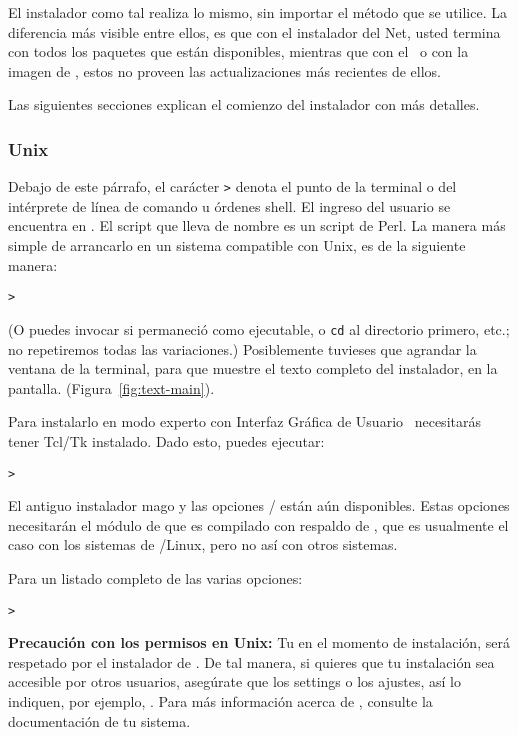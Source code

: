 \documentclass{article}
\begin{document}
El instalador como tal realiza lo mismo, sin importar el método que
se utilice. La diferencia más visible entre ellos, es que con el
instalador del Net, usted termina con todos los paquetes que están
disponibles, mientras que con el \DVD\ o con la imagen de
\ISO, estos no proveen las actualizaciones más recientes de
ellos.

\noindent
Las siguientes secciones explican el comienzo del instalador con más
detalles.

\subsubsection{Unix}

Debajo de este párrafo, el carácter \texttt{>} denota el
punto de la terminal o del intérprete de línea de comando u órdenes shell.
El ingreso del usuario se encuentra en
.  El script que lleva de nombre
 es un script de Perl. La manera más
simple de arrancarlo en un sistema compatible con Unix, es
de la siguiente manera: 

\begin{alltt} 
	>  
\end{alltt} 

(O puedes invocar  si
permaneció como ejecutable, o \texttt{cd} al directorio
primero, etc.; no repetiremos todas las variaciones.)
Posiblemente tuvieses que agrandar la ventana de la
terminal, para que muestre el texto completo del instalador,
en la pantalla.  (Figura~\ref{fig:text-main}).

Para instalarlo en modo experto con Interfaz Gráfica de
Usuario \GUI\, necesitarás tener Tcl/Tk instalado. Dado
esto, puedes ejecutar:
\begin{alltt}
	> 
\end{alltt}

El antiguo instalador mago  y las opciones
/ están aún disponibles. 
Estas opciones necesitarán el módulo de  que es compilado con
respaldo de , que es usualmente el caso con los sistemas de
\GNU/Linux, pero no así con otros sistemas. 

Para un listado completo de las varias opciones:
\begin{alltt}
> 
\end{alltt}

\textbf{Precaución con los permisos en Unix:} Tu  en el
momento de instalación, será respetado por el instalador de \TL{}. De
tal manera, si quieres que tu instalación sea accesible por otros
usuarios, asegúrate que los settings o los ajustes, así lo
indiquen, por ejemplo, . Para más
información acerca de 
, consulte la documentación de tu sistema. 
\end{document}
